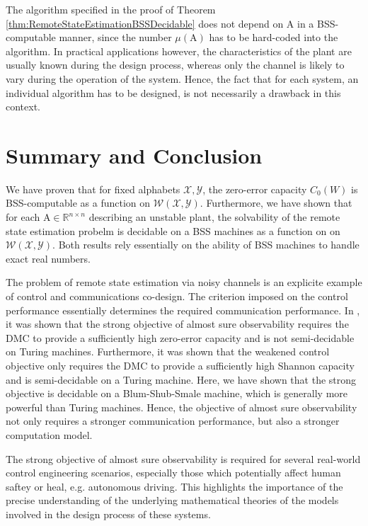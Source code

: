\documentclass[conference]{IEEEtran}
\def\X{{\mathcal X}}
\def\Y{{\mathcal Y}}
\def\W{{\mathcal W}}
\def\RR{{\mathbb R}}
\def\mA{\bm{\mathrm{A}}}
\newcommand{\tbr}[1]{}
\begin{document}
	The algorithm specified in the proof of Theorem \ref{thm:RemoteStateEstimationBSSDecidable} does not depend on \(\mA\) in a BSS-computable manner,
	since the number \(\mu(\mA)\) has to be hard-coded into the algorithm. In practical applications however, the characteristics of the plant
	are usually known during the design process, whereas only the channel is likely to vary during the operation
	of the system. Hence, the fact that for each system, an individual algorithm has to be designed, is not necessarily a drawback in this context.
	
\section{Summary and Conclusion}	\label{sec:Conclusion}
	We have proven that for fixed alphabets \(\X,\Y\), the zero-error capacity \(C_0(W)\) is BSS-computable as a function on \(\W(\X,\Y)\).
	Furthermore, we have shown that for each \(\mA\in \RR^{n\times n}\) describing an unstable plant, the solvability of the remote state estimation
	probelm is decidable on a BSS machines as a function on on \(\W(\X,\Y)\). Both results rely essentially on the ability of BSS machines to handle exact real numbers.
	
	The problem of remote state estimation via noisy channels is an explicite example of control and communications co-design. The criterion imposed on the control performance
	essentially determines the required communication performance. In \cite{MS07,BoBoDe21}\tbr{{\color{red}\(\leftarrow\) Change to TAC!~}}, it was shown that the strong objective of almost sure observability requires the DMC to provide a sufficiently high
	zero-error capacity and is not semi-decidable on Turing machines. Furthermore, it was shown that the weakened control objective only requires the DMC to provide a sufficiently high
	Shannon capacity and is semi-decidable on a Turing machine. Here, we have shown that the strong objective is decidable on a Blum-Shub-Smale machine, which is generally more powerful than
	Turing machines. Hence, the objective of almost sure observability not only requires a stronger communication performance, but also a stronger computation model.
	
	The strong objective of almost sure observability is required for several real-world control engineering scenarios, especially those which potentially affect human saftey or heal, e.g.
	autonomous driving. This highlights the importance of the precise understanding of the underlying mathematical theories of the models involved in the design process of these systems.

		



\end{document}
